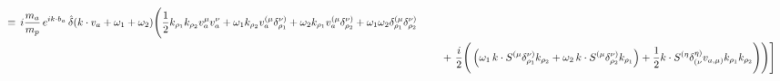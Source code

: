 \begin{align}
\begin{split}
\equiv \, i\frac{m_a }{m_p} \,e^{ik\cdot b_a}\,\hat\delta(k\cdot v_a+\omega_1+\omega_2) \Bigg(\frac{1}{2} k_{\rho_1} k_{\rho_2} v_a^\mu v_a^\nu +\omega_1 k_{\rho_2}v_a^{(\mu}\delta^{\nu)}_{\rho_1}+\omega_2 k_{\rho_1}v_a^{(\mu}\delta^{\nu)}_{\rho_2}+\omega_1\omega_2 \delta^{(\mu}_{\rho_1}\delta^{\nu)}_{\rho_2}\\&
\hspace{0.8cm}+\left.\frac{i}{2}\Bigg(\left(\omega _1 \,k\cdot S^{(\mu }\delta ^{\nu )}_{\rho _1}k_{\rho _2}+\omega _2\,k \cdot S^{(\mu }\delta ^{\nu )}_{\rho _2}k_{\rho _1}\right)+\frac{1}{2}k\cdot S^{(\eta }\delta ^{\eta )}_{(\nu }v_{a,\mu )}k_{\rho _1}k_{\rho _2}\Bigg)\Bigg)\right]
    \end{split}
\end{align}
\endgroup
